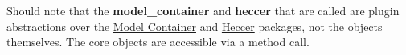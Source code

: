 \documentclass[12pt]{article}
\begin{document}
Should note that the {\bf model\_container} and {\bf heccer} that are called are plugin abstractions over the \href{../model-container/model-container.tex}{Model Container} and \href{../heccer/heccer.tex}{Heccer} packages, not the objects themselves. The core objects are accessible via a method call. 
\end{document}
